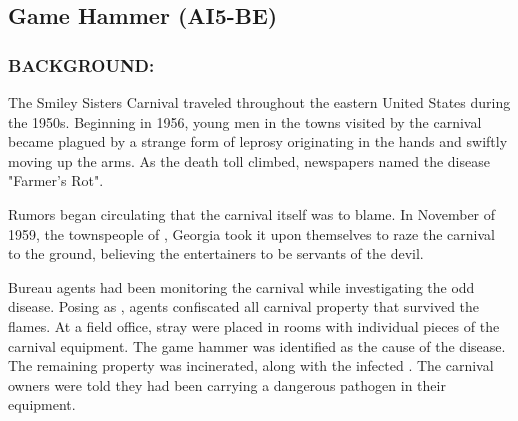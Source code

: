 \subsection*{Game Hammer (AI5-BE)}
\subsubsection*{BACKGROUND:}
\par The Smiley Sisters Carnival traveled throughout the eastern
United States during the 1950s. Beginning in 1956, young men in
the towns visited by the carnival became plagued by a strange
form of leprosy originating in the hands and swiftly moving up the
arms. As the death toll climbed, newspapers named the disease
"Farmer's Rot".
\par Rumors began circulating that the carnival itself was to blame. In
November of 1959, the townspeople of ,
Georgia took it upon themselves to raze the carnival to the ground,
believing the entertainers to be servants of the devil.
\par Bureau agents had been monitoring the carnival while
investigating the odd disease. Posing as 
, agents confiscated all carnival
property that survived the flames. At a field office, stray 
were placed in rooms with individual pieces of the
carnival equipment. The game hammer was identified as the
cause of the disease. The remaining property was incinerated,
along with the infected .
The carnival owners were told they had been carrying a dangerous pathogen in their
equipment.